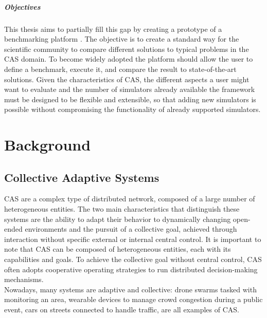 \documentclass[12pt,a4paper,openright,twoside]{book}
\begin{document}
\paragraph{Objectives}
This thesis aims to partially fill this gap by creating a prototype of a benchmarking platform \cite{DBLP:conf/cisis/VilenicaL12, DBLP:conf/atal/ZhangZWBR20}.
The objective is to create a standard way for the scientific community to compare different solutions to typical problems in the \ac*{CAS} domain.
To become widely adopted the platform should allow the user to define a benchmark, execute it, and compare the result to state-of-the-art solutions.
Given the characteristics of \ac*{CAS}, the different aspects a user might want to evaluate and the number of simulators already available the framework must be designed to be flexible and extensible, 
so that adding new simulators is possible without compromising the functionality of already supported simulators. \cite{DBLP:conf/mascots/Dujmovic99}

\chapter{Background}

\section{Collective Adaptive Systems}

\ac{CAS} are a complex type of distributed network, composed of a large number of heterogeneous entities.
The two main characteristics that distinguish these systems are the ability to adapt their behavior to dynamically changing open-ended environments
and the pursuit of a collective goal, achieved through interaction without specific external or internal central control. \cite{DBLP:series/lncs/HolzlRW08, DBLP:journals/corr/abs-1108-5643}
It is important to note that \ac{CAS} can be composed of heterogeneous entities, each with its capabilities and goals.
To achieve the collective goal without central control, \ac{CAS} often adopts cooperative operating strategies to run distributed decision-making mechanisms. \cite{DBLP:journals/tomacs/Aldini18} \\

Nowadays, many systems are adaptive and collective: drone swarms tasked with monitoring an area,
wearable devices to manage crowd congestion during a public event, cars on streets connected to handle traffic,
are all examples of CAS. \cite{DBLP:journals/sttt/NicolaJW20}
\end{document}
